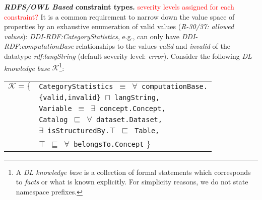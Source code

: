\documentclass[conference]{IEEEtran}
\newcommand{\ms}[1]{\texttt{#1}}
\newenvironment{DL}{
  \small
  \vspace{0cm}
	\begin{center}
  \begin{tabular}{c l}

}{
  \end{tabular}
	\end{center}
}
\begin{document}
\textbf{\emph{RDFS/OWL Based} constraint types.}
\textcolor{red}{severity levels assigned for each constraint?}
It is a common requirement to narrow down the value space of properties by an exhaustive enumeration of valid values (\emph{R-30/37: allowed values}):
\emph{DDI-RDF:CategoryStatistics}, e.g., can only have \emph{DDI-RDF:computationBase} relationships to the values \emph{valid} and \emph{invalid} of the datatype \emph{rdf:langString} (default severity level: \emph{error}).
Consider the following \emph{DL knowledge base} $\mathcal{K}$\footnote{A \emph{DL knowledge base} is a collection of formal statements which corresponds to \emph{facts} or what is known explicitly. For simplicity reasons, we do not state namespace prefixes.}:
\begin{center}
\begin{DL} 
$\mathcal{K}=\{$ 
&{\small\ms{CategoryStatistics $\equiv$ $\forall$ computationBase.}} \\
	&{\small\ms{\{valid,invalid\} $\sqcap$ langString,}} \\
  &{\small\ms{Variable $\equiv$ $\exists$ concept.Concept,}} \\
	&{\small\ms{Catalog $\sqsubseteq$ $\forall$ dataset.Dataset,}} \\
  &{\small\ms{$\exists$ isStructuredBy.$\top$ $\sqsubseteq$ Table,}} \\
	&{\small\ms{$\top$ $\sqsubseteq$ $\forall$ belongsTo.Concept}}
\}\\ 
\end{DL}
\end{center}
\end{document}
